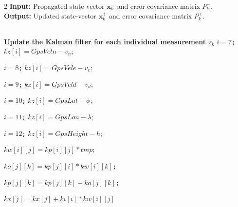 \documentclass[journal]{IEEEtran}
\begin{document}
\begin{tcolorbox}[float*=!tbph]
\begin{algorithm}[H]
\caption{State-vector and error covariance matrix update}
\begin{multicols}{2}
 \hspace*{\algorithmicindent} \textbf{Input:} Propagated state-vector $\boldsymbol{x}_k^-$ and error covariance matrix ${P}_k^-$.\\
 \hspace*{\algorithmicindent} \textbf{Output:} Updated state-vector $\boldsymbol{x}_k^+$ and error covariance matrix ${P}_k^+$.\\
\begin{algorithmic}[1]
\\\textbf{\color{Red}Update the Kalman filter for each individual measurement $z_k$}
\State \texttt{$i=7$;}
\State \texttt{$kz[i] = GpsVeln -v_n;$}

\State \texttt{$i=8$;}
\State \texttt{$kz[i] = GpsVele -v_e;$}

\State \texttt{$i=9$;}
\State \texttt{$kz[i] = GpsVeld -v_d;$}

\State \texttt{$i=10$;}
\State \texttt{$kz[i] = GpsLat -\phi;$}

\State \texttt{$i=11$;}
\State \texttt{$kz[i] = GpsLon -\lambda;$}

\State \texttt{$i=12$;}
\State \texttt{$kz[i] = GpsHeight -h;$}


        \State \texttt{$kw[i][j] = kp[i][j] * tmp ;$}
      \EndFor
      
        \State \texttt{$ko[j][k] = kp[j][i] * kw[i][k]$;}
      \EndFor
      \EndFor 
      
        \State \texttt{$kp[j][k] = kp[j][k] - ko[j][k]$;}
      \EndFor
      \EndFor 
        
        \State \texttt{$kx[j] = kx[j] + ki[i] * kw[i][j]$}
      \EndFor
      

\end{algorithmic}
\end{multicols}
\end{algorithm}
\end{tcolorbox}
\end{document}
